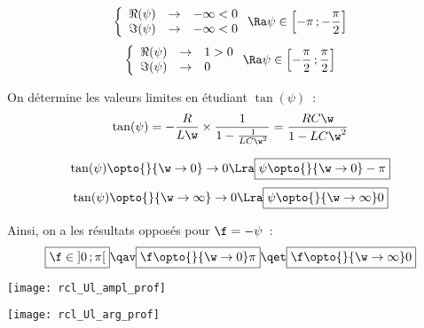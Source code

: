 \documentclass[../TDE6_rsf.tex]{subfiles}%
\begin{document}
{\begin{isd}
\[		\left\{
		\begin{array}{rcl}
			\Re(\psi) & \to & -\infty < 0
			\\
			\Im(\psi) & \to & -\infty < 0
		\end{array}
		\right.
		\Ra
		\psi \in \left[ - \pi\,; -\frac{\pi}{2} \right]
	\]
	\tcblower
	\tcbsubtitle{\fatbox{$\w\to\infty$}}
	\[
		\left\{
		\begin{array}{rcl}
			\Re(\psi) & \to & 1 > 0
			\\
			\Im(\psi) & \to & 0
		\end{array}
		\right.
		\Ra
		\psi \in \left[ - \frac{\pi}{2}\,; \frac{\pi}{2} \right]
	\]
\end{isd}
On détermine les valeurs limites en étudiant $\tan(\psi)$~:
\begin{gather*}
	\tan(\psi)
	= -\frac{R}{L\w}\times \frac{1}{1 - \frac{1}{LC\w^2}}
	= \frac{RC\w}{1 - LC\w^2}
\end{gather*}
\noindent
\begin{isd}
	\[
		\tan(\psi) \opto{}{\w\to 0} \to 0
		\Lra
		\boxed{\psi \opto{}{\w\to 0} -\pi}
	\]
	\tcblower
	\tcbsubtitle{\fatbox{$\w\to\infty$}}
	\[
		\tan(\psi) \opto{}{\w\to\infty} \to 0
		\Lra
		\boxed{\psi \opto{}{\w\to\infty} 0}
	\]
\end{isd}
Ainsi, on a les résultats opposés pour $\f = -\psi$~:
\[
	\boxed{\f \in \left] 0\,;\pi \right[}
	\qav
	\boxed{\f \opto{}{\w\to 0} \pi}
	\qet
	\boxed{\f \opto{}{\w\to\infty} 0}
\]
\noindent
\begin{isd}
	\begin{center}
		\texttt{[image: rcl\_Ul\_ampl\_prof]}
	\end{center}
	\tcblower
	\begin{center}
		\texttt{[image: rcl\_Ul\_arg\_prof]}
	\end{center}
\end{isd}
}

\end{document}
